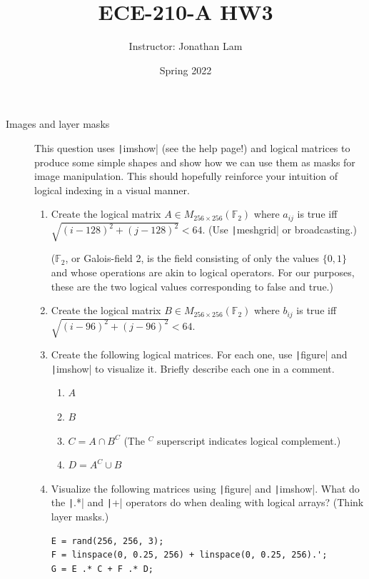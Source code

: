 \documentclass{article}
\title{ECE-210-A HW3}
\author{Instructor: Jonathan Lam}
\date{Spring 2022}
\begin{document}
\maketitle

\begin{description}
\item[Images and layer masks] This question uses \texttt|imshow| (see the help page!) and logical matrices to produce some simple shapes and show how we can use them as masks for image manipulation. This should hopefully reinforce your intuition of logical indexing in a visual manner.
  
  \begin{enumerate}
  \item Create the logical matrix $A\in M_{256\times 256}(\mathbb{F}_2)$ where $a_{ij}$ is true iff $\sqrt{(i-128)^2+(j-128)^2}<64$. (Use \texttt|meshgrid| or broadcasting.)
    
    ($\mathbb{F}_2$, or Galois-field 2, is the field consisting of only the values $\{0,1\}$ and whose operations are akin to logical operators. For our purposes, these are the two logical values corresponding to false and true.)
    
  \item Create the logical matrix $B\in M_{256\times 256}(\mathbb{F}_2)$ where $b_{ij}$ is true iff $\sqrt{(i-96)^2+(j-96)^2}<64$.
    
  \item Create the following logical matrices. For each one, use \texttt|figure| and \texttt|imshow| to visualize it. Briefly describe each one in a comment.
    \begin{enumerate}
    \item $A$
    \item $B$
    \item $C=A\cap B^C$ (The $^C$ superscript indicates logical complement.)
    \item $D=A^C\cup B$
    \end{enumerate}
    
  \item Visualize the following matrices using \texttt|figure| and \texttt|imshow|. What do the \texttt|.*| and \texttt|+| operators do when dealing with logical arrays? (Think layer masks.)
\begin{verbatim}
E = rand(256, 256, 3);
F = linspace(0, 0.25, 256) + linspace(0, 0.25, 256).';
G = E .* C + F .* D;
\end{verbatim}
    

\end{enumerate}
\end{description}
\end{document}
